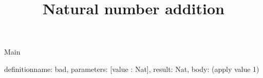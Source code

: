 \begin{lexlean}{Main}
\title{Natural number addition}
\begin{semanticmodule}
definition{name: bad, parameters: [value : Nat], result: Nat, body: (apply value 1)}
\end{semanticmodule}
\end{lexlean}
